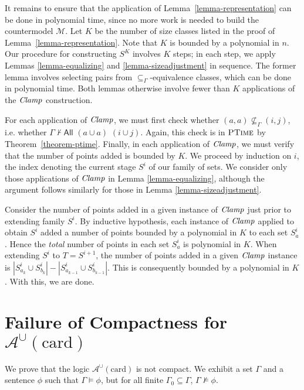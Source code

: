 \documentclass[letterpaper]{article} %
\theoremstyle{definition}
\newcommand{\Model}{\mathcal{M}}
\newcommand{\proves}{\vdash}
\newcommand{\Aunion}{\mathscr{A}^{\cup}}
\newcommand{\Ptime}{\textsc{PTime}}
\newcommand{\All}[2]{\mathsf{All}\,\,#1\,\,#2}
\newcommand{\card}{\mathrm{card}}
\newcommand{\Clamp}{\protect{\mbox{\textit{Clamp}}}}
\newcommand{\provsub}{\subseteq_{\Gamma}}
\begin{document}
It remains to ensure that the application of Lemma~\ref{lemma-representation} can be done in polynomial time, since no more work is needed to build the countermodel $\Model$.  Let $K$ be the number of size classes listed in the proof of Lemma~\ref{lemma-representation}.  Note that $K$ is bounded by a polynomial in $n$.  Our procedure for constructing $S^K$ involves $K$ steps; in each step, we apply Lemmas \ref{lemma-equalizing} and \ref{lemma-sizeadjustment} in sequence.  The former lemma involves selecting pairs from $\provsub$-equivalence classes, which can be done in polynomial time.  Both lemmas otherwise involve fewer than $K$ applications of the $\Clamp$ construction.  

For each application of $\Clamp$, we must first check whether $(a, a) \not \provsub (i, j)$, i.e. whether $\Gamma \not \proves \All{(a \cup a)}{(i \cup j)}.$   Again, this check is in $\Ptime$ by Theorem~\ref{theorem-ptime}.
Finally, in each application of $\Clamp$, we must verify that the number of points added is bounded by $K$.  We proceed by induction on $i$, the index denoting the current stage $S^i$ of our family of sets.  We consider only those applications of $\Clamp$ in Lemma \ref{lemma-equalizing}, although the argument follows similarly for those in Lemma \ref{lemma-sizeadjustment}.

Consider the number of points added in a given instance of $\Clamp$ just prior to extending family $S^i$.  By inductive hypothesis, each instance of $\Clamp$ applied to obtain $S^i$ added a number of points bounded by a polynomial in $K$ to each set $S^i_a$.  Hence the \textit{total} number of points in each set $S^i_a$ is polynomial in $K$.  When extending $S^i$ to $T = S^{i+1}$, the number of points added in a given $\Clamp$ instance is $|S^i_{a_k} \cup S^i_{b_k}| - |S^i_{a_{k-1}} \cup S^i_{b_{k-1}}|$.  This is consequently bounded by a polynomial in $K$.
With this, we are done.



\section{Failure of Compactness for $\Aunion(\card)$}
\label{s:supp:non-compact}

We prove that the logic $\Aunion(\card)$ is  not compact.
We exhibit a set $\Gamma$ and a sentence $\phi$
 such that
 $\Gamma\models\phi$, but for all finite $\Gamma_0\subseteq\Gamma$,
 $\Gamma\not\models\phi$. 
 
\end{document}
